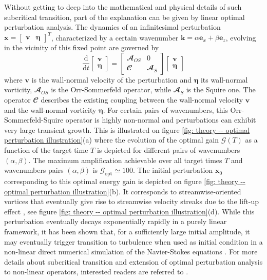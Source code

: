      Without getting to deep into the mathematical and physical details of such subcritical transition, part of the explanation can be given by linear optimal perturbation analysis. The dynamics of an infinitesimal perturbation $\mathbf{x} = \begin{bmatrix} \mathbf{v} & \mathbf{\eta} \end{bmatrix}^T$, characterized by a certain wavenumber $\mathbf{k} = \alpha \mathbf{e}_x + \beta \mathbf{e}_z$, evolving in the vicinity of this fixed point are governed by
      \begin{equation}
        \displaystyle \frac{\mathrm{d}}{\mathrm{d}t} \begin{bmatrix} \mathbf{v} \\ \mathbf{\eta} \end{bmatrix} = \begin{bmatrix} \mathbfcal{A}_{OS} & 0 \\ \mathbfcal{C} & \mathbfcal{A}_{S} \end{bmatrix} \begin{bmatrix} \mathbf{v} \\ \mathbf{\eta} \end{bmatrix}
        \label{eq: theory -- orr-sommerfeld-squire equations}
      \end{equation}
      where $\mathbf{v}$ is the wall-normal velocity of the perturbation and $\mathbf{\eta}$ its wall-normal vorticity, $\mathbfcal{A}_{OS}$ is the Orr-Sommerfeld operator, while $\mathbfcal{A}_{S}$ is the Squire one. The operator $\mathbfcal{C}$ describes the existing coupling between the wall-normal velocity $\mathbf{v}$ and the wall-normal vorticity $\mathbf{\eta}$. For certain pairs of wavenumbers, this Orr-Sommerfeld-Squire operator is highly non-normal and perturbations can exhibit very large transient growth. This is illustrated on figure \ref{fig: theory -- optimal perturbation illustration}(a) where the evolution of the optimal gain $\mathcal{G}(T)$ as a function of the target time $T$ is depicted for different pairs of wavenumbers $(\alpha, \beta)$. The maximum amplification achievable over all target times $T$ and wavenumbers pairs $(\alpha, \beta)$ is $\mathcal{G}_{\mathrm{opt}} \simeq 100$. The initial perturbation $\mathbf{x}_0$ corresponding to this optimal energy gain is depicted on figure \ref{fig: theory -- optimal perturbation illustration}(b). It corresponds to streamwise-oriented vortices that eventually give rise to streamwise velocity streaks due to the lift-up effect \cite{jfm:landahl:1980, ejmbf:brandt:2014}, see figure \ref{fig: theory -- optimal perturbation illustration}(d). While this perturbation eventually decays exponentially rapidly in a purely linear framework, it has been shown that, for a sufficiently large initial amplitude, it may eventually trigger transition to turbulence when used as initial condition in a non-linear direct numerical simulation of the Navier-Stokes equations \cite{??}. For more details about subcritical transition and extension of optimal perturbation analysis to non-linear operators, interested readers are referred to \cite{??}.

